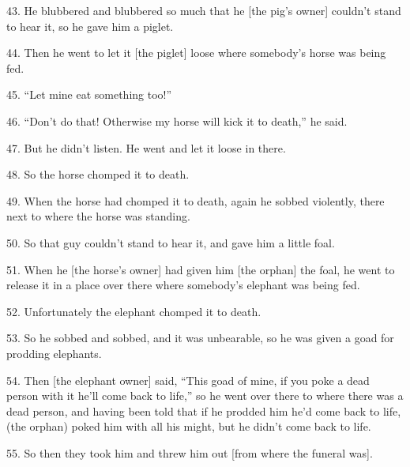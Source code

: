 43. He blubbered and blubbered so much that he [the pig's owner] couldn't stand
to hear it, so he gave him a piglet.

44. Then he went to let it [the piglet] loose where somebody's horse was being
fed.

45. ``Let mine eat something too!''

46. ``Don't do that! Otherwise my horse will kick it to death,'' he said.

47. But he didn't listen. He went and let it loose in there.

48. So the horse chomped it to death.

49. When the horse had chomped it to death, again he sobbed violently, there next
to where the horse was standing.

50. So that guy couldn't stand to hear it, and gave him a little foal.

51. When he [the horse's owner] had given him [the orphan] the foal, he went to
release it in a place over there where somebody's elephant was being fed.

52. Unfortunately the elephant chomped it to death.

53. So he sobbed and sobbed, and it was unbearable, so he was given a goad for
prodding elephants.

54. Then [the elephant owner] said, ``This goad of mine, if you poke a dead person
with it he'll come back to life,'' so he went over there to where there was a dead
person, and having been told that if he prodded him he'd come back to life, (the
orphan) poked him with all his might, but he didn't come back to life.

55. So then they took him and threw him out [from where the funeral was].

